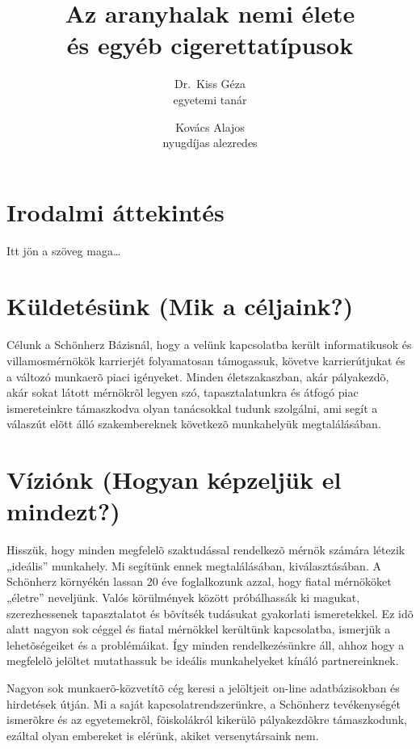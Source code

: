 \documentclass[a4paper]{article}
\begin{document}
\title{Az aranyhalak nemi élete \\
és egyéb cigerettatípusok}
\author{Dr.~Kiss Géza \\ egyetemi tanár \and
Kovács Alajos \\ nyugdíjas alezredes}
\date{}


\maketitle

\tableofcontents

\section{Irodalmi áttekintés}
Itt jön a szöveg maga\dots

\section{Küldetésünk (Mik a céljaink?)}
Célunk a Schönherz Bázisnál, hogy a velünk kapcsolatba került informatikusok és villamosmérnökök karrierjét folyamatosan támogassuk, követve karrierútjukat és a változó munkaerõ piaci igényeket. Minden életszakaszban, akár pályakezdõ, akár sokat látott mérnökrõl legyen szó, tapasztalatunkra és átfogó piac ismereteinkre támaszkodva olyan tanácsokkal tudunk szolgálni, ami segít a válaszút elõtt álló szakembereknek következõ munkahelyük megtalálásában.
\section{Víziónk (Hogyan képzeljük el mindezt?)}
Hisszük, hogy minden megfelelõ szaktudással rendelkezõ mérnök számára létezik „ideális” munkahely. Mi segítünk ennek megtalálásában, kiválasztásában. A Schönherz környékén lassan 20 éve foglalkozunk azzal, hogy fiatal mérnököket „életre” neveljünk. Valós körülmények között próbálhassák ki magukat, sze\-rezhessenek tapasztalatot és bõvítsék tudásukat gyakorlati ismeretekkel. Ez idõ alatt nagyon sok céggel és fiatal mérnökkel kerültünk kapcsolatba, ismerjük a lehetõségeiket és a problémáikat. Így minden rendelkezésünkre áll, ahhoz hogy a megfelelõ jelöltet mutathassuk be ideális munkahelyeket kínáló partnereinknek.

Nagyon sok munkaerõ-közvetítõ cég keresi a jelöltjeit on-line adatbázisokban és hirdetések útján. Mi a saját kapcsolatrendszerünkre, a Schönherz tevékenységét ismerõkre és az egyetemekrõl, fõiskolákról kikerülõ pályakezdõkre támaszkodunk, ezáltal olyan embereket is elérünk, akiket versenytársaink nem.
\end{document}
